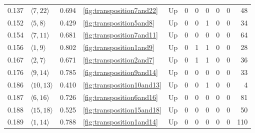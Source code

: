 \documentclass{article}
\begin{document}
\begin{center}
\begin{tabular}{lllllrrrrrr}
0.137 & $\langle7, 22\rangle$ & 0.694 & \ref{fig:transposition7and22} & Up & 0 & 0 & 0 & 0 & 0 & 48 \\
\cline{1-11} \cline{2-11} \cline{3-11} \cline{4-11}
0.152 & $\langle5, 8\rangle$ & 0.429 & \ref{fig:transposition5and8} & Up & 0 & 0 & 1 & 0 & 0 & 34 \\
\cline{1-11} \cline{2-11} \cline{3-11} \cline{4-11}
0.154 & $\langle7, 11\rangle$ & 0.681 & \ref{fig:transposition7and11} & Up & 0 & 0 & 0 & 0 & 0 & 64 \\
\cline{1-11} \cline{2-11} \cline{3-11} \cline{4-11}
0.156 & $\langle1, 9\rangle$ & 0.802 & \ref{fig:transposition1and9} & Up & 0 & 1 & 1 & 0 & 0 & 28 \\
\cline{1-11} \cline{2-11} \cline{3-11} \cline{4-11}
0.167 & $\langle2, 7\rangle$ & 0.671 & \ref{fig:transposition2and7} & Up & 0 & 1 & 1 & 0 & 0 & 36 \\
\cline{1-11} \cline{2-11} \cline{3-11} \cline{4-11}
0.176 & $\langle9, 14\rangle$ & 0.785 & \ref{fig:transposition9and14} & Up & 0 & 0 & 0 & 0 & 0 & 33 \\
\cline{1-11} \cline{2-11} \cline{3-11} \cline{4-11}
0.186 & $\langle10, 13\rangle$ & 0.410 & \ref{fig:transposition10and13} & Up & 0 & 0 & 1 & 0 & 0 & 4 \\
\cline{1-11} \cline{2-11} \cline{3-11} \cline{4-11}
0.187 & $\langle6, 16\rangle$ & 0.726 & \ref{fig:transposition6and16} & Up & 0 & 0 & 0 & 0 & 0 & 81 \\
\cline{1-11} \cline{2-11} \cline{3-11} \cline{4-11}
0.188 & $\langle15, 18\rangle$ & 0.525 & \ref{fig:transposition15and18} & Up & 0 & 0 & 0 & 0 & 0 & 50 \\
\cline{1-11} \cline{2-11} \cline{3-11} \cline{4-11}
0.189 & $\langle1, 14\rangle$ & 0.788 & \ref{fig:transposition1and14} & Up & 0 & 0 & 0 & 0 & 0 & 110 \\
\cline{1-11} \cline{2-11} \cline{3-11} \cline{4-11}
\bottomrule
\end{tabular}


\end{center}
\end{document}
